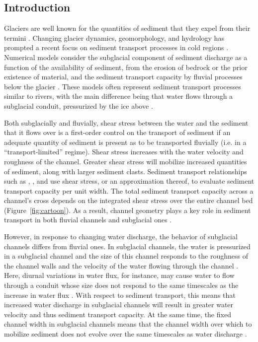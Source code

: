 \documentclass[11pt]{article}
\begin{document}
\begin{spacing}{1}
  \section{Introduction}
  
  Glaciers are well known for the quantities of sediment that they expel from their termini \citep{hallet1996}.
  Changing glacier dynamics, geomorphology, and hydrology  has prompted a recent focus on  sediment transport processes in cold regions \citep[e.g.][]{zhang2022}.          
  Numerical models consider the subglacial component of sediment discharge as a function of the availability of sediment, from the erosion of bedrock or the prior existence of material, and the sediment transport capacity by fluvial processes below the glacier \citep{creyts2013,brinkerhoff2017,beaud2018,delaney2019}.
  These models often represent sediment transport processes similar to rivers, with the main difference being that water flows through a subglacial conduit, pressurized by the ice above \citep{rothlisberger1972}.

  Both subglacially and fluvially, shear stress between the water and the sediment that it flows over is a first-order control on the transport of sediment \citep{shields1936} if an adequate quantity of sediment is present as to be transported fluvially (i.e. in a ``transport-limited'' regime). 
  Shear stress increases with the water velocity and roughness of the channel.
  Greater shear stress will mobilize increased quantities of sediment, along with larger sediment clasts.
  Sediment transport relationships such as \citet{shields1936}, \citet{meyer1948},  and \citet{engelund1967} use shear stress, or an approximation thereof, to evaluate sediment transport capacity per unit width.
  The total sediment transport capacity across a channel's cross depends on the integrated shear stress over the entire channel bed (Figure~\ref{fig:cartoon}).
  As a result, channel geometry plays a key role in sediment transport in both fluvial channels and subglacial ones \citep[e.g.][]{church2006,delaney2019}.
  
  However, in response to changing water discharge, the behavior of subglacial channels differs from fluvial ones.
  In subglacial channels, the water is pressurized in a subglacial channel and the size of this channel responds to the roughness of the channel walls and the velocity of the water flowing through the channel \citep[Figure~\ref{fig:cartoon}\,a and c; e.g. ][]{rothlisberger1972}.
  Here, diurnal variations in water flux, for instance, may cause water to flow through a conduit whose size does not respond to the same timescales as the increase in water flux \citep{rothlisberger1972}.
  With respect to sediment transport, this means that increased water discharge in subglacial channels will result in greater water velocity and thus sediment transport capacity.
  At the same time, the fixed channel width in subglacial channels means that the channel width over which to mobilize sediment does not evolve over the same timescales as water discharge \citep[e.g.][]{werder2010}.
  

\end{spacing}
\end{document}
